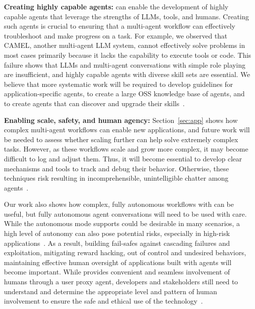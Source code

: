 \textbf{Creating highly capable agents:}
\libName can enable the development of highly capable agents that leverage the strengths of LLMs, tools, and humans. Creating such agents is crucial to ensuring that a multi-agent workflow can effectively troubleshoot and make progress on a task. For example, we observed that CAMEL, another multi-agent LLM system, cannot effectively solve problems in most cases primarily because it lacks the capability to execute tools or code. 
This failure shows that LLMs and multi-agent conversations with simple role playing are insufficient, and highly capable agents with diverse skill sets are essential. We believe that more systematic work will be required to
develop guidelines for application-specific agents,
to create a large OSS knowledge base of agents,
and to create agents that can discover and upgrade their skills~\cite{cai2023large}.


\textbf{Enabling scale, safety, and human agency:}
Section~\ref{sec:app} shows how complex multi-agent workflows can enable new applications, and future work will be needed to assess whether scaling further can help solve extremely complex tasks.
However, as these workflows scale and grow more complex, it may become difficult to log and adjust them. 
Thus, it will become essential to develop clear mechanisms and tools to track and debug their behavior. 
Otherwise, these techniques risk resulting in incomprehensible, unintelligible chatter among agents~\cite{lewis2017deal}.

    
    Our work also shows how complex, fully autonomous workflows with \libName can be useful, but fully autonomous agent conversations will need to be used with care. While the autonomous mode \libName supports could be desirable in many scenarios, a high level of autonomy can also pose potential risks, especially in high-risk applications~\cite{amodei-arxiv2016,weld-aaai94}. As a result, building 
    fail-safes against cascading failures and exploitation,
    mitigating reward hacking, 
    out of control and undesired behaviors, 
    maintaining effective human oversight of applications built with \libName agents will become important. 
    While \libName provides convenient and seamless involvement of humans through a user proxy agent, developers and stakeholders still need to understand and determine the appropriate level and pattern of human involvement to ensure the safe and ethical use of the technology~\cite{horvitz-chi99,amershi-chi19}.